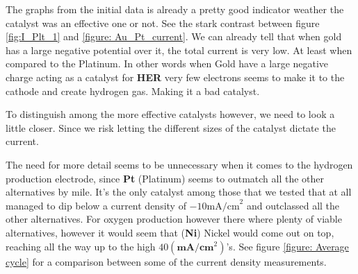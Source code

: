 \documentclass[twocolumn]{revtex4-2}
\begin{document}
The 
graphs from the initial data is already a pretty good indicator weather the catalyst
was an effective one or not. See the stark contrast between figure \ref{fig:I_Plt_1} and 
\ref{figure: Au_Pt_current}. We can already tell that when gold has a large negative 
potential over it, the total current is very low. At least when compared to the Platinum.
In other words when Gold have a large negative charge acting as a catalyst for \textbf{HER}
very few electrons seems to make it to the cathode and create hydrogen gas. Making it a 
bad catalyst. 
\par
To distinguish among the more effective catalysts however,
we need to look a little closer. Since we risk letting the different sizes 
of the catalyst dictate the current.
\par 
The need for more detail seems to be unnecessary when it comes to the hydrogen production
electrode, since \textbf{Pt} (Platinum) seems to outmatch all the other alternatives by mile.
It's the only catalyst among those that we tested that at all managed to dip below a current
density of $ - 10\text{mA/cm} ^2$ and outclassed all the other alternatives. For oxygen production 
however there where plenty of viable alternatives, however it would seem that (\textbf{Ni}) Nickel would 
come out on top, reaching all the way up to the high $40(\textbf{mA}/\textbf{cm}^2)$'s. See figure
\ref{figure: Average cycle} for a comparison between some of the current density measurements.
\end{document}
